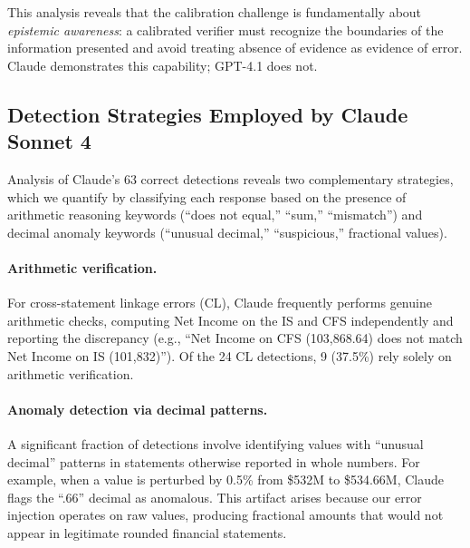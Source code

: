 \documentclass[11pt]{article}
\begin{document}
This analysis reveals that the calibration challenge is fundamentally about \emph{epistemic awareness}: a calibrated verifier must recognize the boundaries of the information presented and avoid treating absence of evidence as evidence of error.
Claude demonstrates this capability; GPT-4.1 does not.

\subsection{Detection Strategies Employed by Claude Sonnet 4}
\label{sec:analysis:strategies}

Analysis of Claude's 63 correct detections reveals two complementary strategies, which we quantify by classifying each response based on the presence of arithmetic reasoning keywords (``does not equal,'' ``sum,'' ``mismatch'') and decimal anomaly keywords (``unusual decimal,'' ``suspicious,'' fractional values).

\paragraph{Arithmetic verification.}
For cross-statement linkage errors (CL), Claude frequently performs genuine arithmetic checks, computing Net Income on the IS and CFS independently and reporting the discrepancy (e.g., ``Net Income on CFS (103,868.64) does not match Net Income on IS (101,832)'').
Of the 24 CL detections, 9 (37.5\%) rely solely on arithmetic verification.

\paragraph{Anomaly detection via decimal patterns.}
A significant fraction of detections involve identifying values with ``unusual decimal'' patterns in statements otherwise reported in whole numbers.
For example, when a value is perturbed by 0.5\% from \$532M to \$534.66M, Claude flags the ``.66'' decimal as anomalous.
This artifact arises because our error injection operates on raw values, producing fractional amounts that would not appear in legitimate rounded financial statements.
\end{document}

